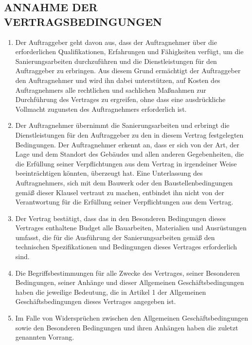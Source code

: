 \begin{multicols}{2}
  \subsection{ANNAHME DER VERTRAGSBEDINGUNGEN}
  \begin{enumerate}
  \item Der Auftraggeber geht davon aus, dass der Auftragnehmer über die erforderlichen Qualifikationen, Erfahrungen und Fähigkeiten verfügt, um die Sanierungsarbeiten durchzuführen und die Dienstleistungen für den Auftraggeber zu erbringen. Aus diesem Grund ermächtigt der Auftraggeber den Auftragnehmer und wird ihn dabei unterstützen, auf Kosten des Auftragnehmers alle rechtlichen und sachlichen Maßnahmen zur Durchführung des Vertrages zu ergreifen, ohne dass eine ausdrückliche Vollmacht zugunsten des Auftragnehmers erforderlich ist.
  \item Der Auftragnehmer übernimmt die Sanierungsarbeiten und erbringt die Dienstleistungen für den Auftraggeber zu den in diesem Vertrag festgelegten Bedingungen. Der Auftragnehmer erkennt an, dass er sich von der Art, der Lage und dem Standort des Gebäudes und allen anderen Gegebenheiten, die die Erfüllung seiner Verpflichtungen aus dem Vertrag in irgendeiner Weise beeinträchtigen könnten, überzeugt hat. Eine Unterlassung des Auftragnehmers, sich mit dem Bauwerk oder den Baustellenbedingungen gemäß dieser Klausel vertraut zu machen, entbindet ihn nicht von der Verantwortung für die Erfüllung seiner Verpflichtungen aus dem Vertrag.
  \item Der Vertrag bestätigt, dass das in den Besonderen Bedingungen dieses Vertrages enthaltene Budget alle Bauarbeiten, Materialien und Ausrüstungen umfasst, die für die Ausführung der Sanierungsarbeiten gemäß den technischen Spezifikationen und Bedingungen dieses Vertrages erforderlich sind.
  \item Die Begriffsbestimmungen für alle Zwecke des Vertrages, seiner Besonderen Bedingungen, seiner Anhänge und dieser Allgemeinen Geschäftsbedingungen haben die jeweilige Bedeutung, die in Artikel 1 der Allgemeinen Geschäftsbedingungen dieses Vertrages angegeben ist.
  \item Im Falle von Widersprüchen zwischen den Allgemeinen Geschäftsbedingungen sowie den Besonderen Bedingungen und ihren Anhängen haben die zuletzt genannten Vorrang.
  \end{enumerate}


\end{multicols}
